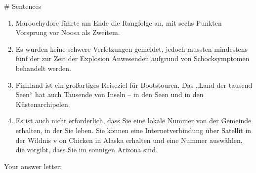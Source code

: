 \begin{figure*}[ht]
\begin{tcolorbox}
\medskip

\# Sentences

\begin{enumerate}[label=\Alph*., itemsep=0pt, topsep=0pt]
    \item \textasciigrave\textasciigrave\textasciigrave Maroochydore führte am Ende die Rangfolge an, mit sechs Punkten Vorsprung vor Noosa als Zweitem.\textasciigrave\textasciigrave\textasciigrave
    \item \textasciigrave\textasciigrave\textasciigrave 
    Es wurden keine schwere Verletzungen gemeldet, jedoch mussten mindestens fünf der zur Zeit der Explosion Anwesenden aufgrund von Schocksymptomen behandelt werden.\textasciigrave\textasciigrave\textasciigrave
    \item \textasciigrave\textasciigrave\textasciigrave 
    Finnland ist ein großartiges Reiseziel für Bootstouren. Das „Land der tausend Seen“ hat auch Tausende von Inseln – in den Seen und in den Küstenarchipelen.\textasciigrave\textasciigrave\textasciigrave
    \item \textasciigrave\textasciigrave\textasciigrave 
    Es ist auch nicht erforderlich, dass Sie eine lokale Nummer von der Gemeinde erhalten, in der Sie leben. Sie können eine Internetverbindung über Satellit in der Wildnis v on Chicken in Alaska erhalten und eine Nummer auswählen, die vorgibt, dass Sie im sonnigen Arizona sind.\textasciigrave\textasciigrave\textasciigrave
\end{enumerate}
Your answer letter: 
\end{tcolorbox}
\end{figure*}

\clearpage

